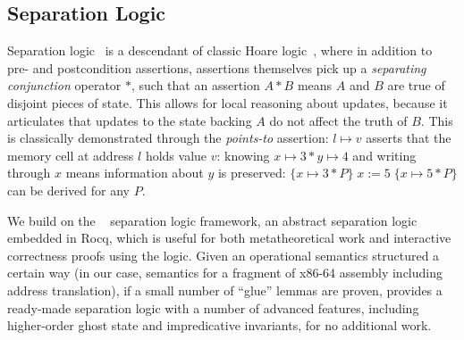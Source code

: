 
\subsection{Separation Logic}
\label{sec:seplogic}
Separation logic~\cite{reynolds02} is a descendant of classic Hoare logic~\cite{hoare69},
where in addition to pre- and postcondition assertions, assertions themselves pick up a
\emph{separating conjunction} operator $\ast$, such that an assertion $A\ast B$ means $A$ and $B$ are true
of disjoint pieces of state. This allows for local reasoning about updates, because it articulates
that updates to the state backing $A$ do not affect the truth of $B$. This is classically demonstrated
through the \emph{points-to} assertion: $l\mapsto v$ asserts that the memory cell at address $l$ holds value $v$:
knowing $x\mapsto 3\ast y\mapsto 4$ and writing through $x$ means information about $y$ is preserved:
$\{x\mapsto 3\ast P\}\;x\mathrel{:=}5\;\{x\mapsto 5 \ast P\}$ can be derived for any $P$.

We build on the \iris~\cite{jung2018iris} separation logic framework,
an abstract separation logic embedded in Rocq, which is useful for both metatheoretical work
and interactive correctness proofs using the logic. Given an operational
semantics structured a certain way (in our case, semantics for
a fragment of x86-64 assembly including address translation),
if a small number of ``glue'' lemmas are proven, \iris
provides a ready-made separation logic with a number of advanced features, including
higher-order ghost state and impredicative invariants, for no additional work.

